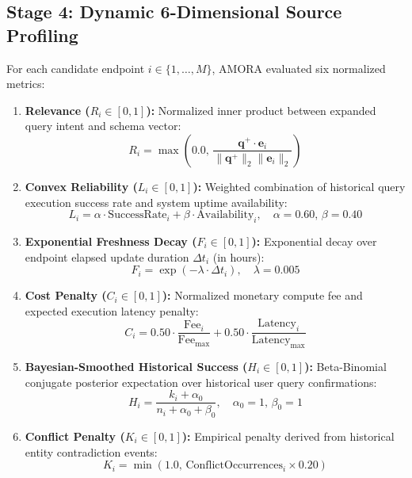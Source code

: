 \documentclass[conference,onecolumn,10pt]{IEEEtran}
\begin{document}
\subsection{Stage 4: Dynamic 6-Dimensional Source Profiling}
\label{subsec:stage4_profiling}
For each candidate endpoint $i \in \{1, \dots, M\}$, AMORA evaluated six normalized metrics:
\begin{enumerate}
    \item \textbf{Relevance ($R_i \in [0, 1]$):} Normalized inner product between expanded query intent and schema vector:
    \begin{equation}
        R_i = \max\left(0.0, \, \frac{\mathbf{q}^+ \cdot \mathbf{e}_i}{\|\mathbf{q}^+\|_2 \|\mathbf{e}_i\|_2}\right)
    \end{equation}
    \item \textbf{Convex Reliability ($L_i \in [0, 1]$):} Weighted combination of historical query execution success rate and system uptime availability:
    \begin{equation}
        L_i = \alpha \cdot \text{SuccessRate}_i + \beta \cdot \text{Availability}_i, \quad \alpha = 0.60, \, \beta = 0.40
    \end{equation}
    \item \textbf{Exponential Freshness Decay ($F_i \in [0, 1]$):} Exponential decay over endpoint elapsed update duration $\Delta t_i$ (in hours):
    \begin{equation}
        F_i = \exp(-\lambda \cdot \Delta t_i), \quad \lambda = 0.005
    \end{equation}
    \item \textbf{Cost Penalty ($C_i \in [0, 1]$):} Normalized monetary compute fee and expected execution latency penalty:
    \begin{equation}
        C_i = 0.50 \cdot \frac{\text{Fee}_i}{\text{Fee}_{\text{max}}} + 0.50 \cdot \frac{\text{Latency}_i}{\text{Latency}_{\text{max}}}
    \end{equation}
    \item \textbf{Bayesian-Smoothed Historical Success ($H_i \in [0, 1]$):} Beta-Binomial conjugate posterior expectation over historical user query confirmations:
    \begin{equation}
        H_i = \frac{k_i + \alpha_0}{n_i + \alpha_0 + \beta_0}, \quad \alpha_0 = 1, \, \beta_0 = 1
    \end{equation}
    \item \textbf{Conflict Penalty ($K_i \in [0, 1]$):} Empirical penalty derived from historical entity contradiction events:
    \begin{equation}
        K_i = \min(1.0, \, \text{ConflictOccurrences}_i \times 0.20)
    \end{equation}
\end{enumerate}
\end{document}
